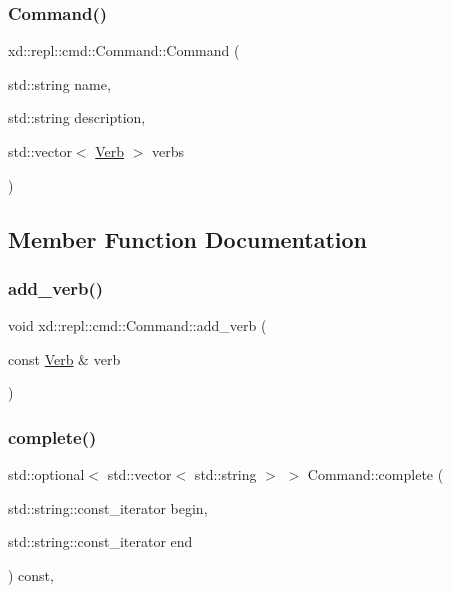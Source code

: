 \subsubsection{\texorpdfstring{Command()}{Command()}}
{\footnotesize\ttfamily xd\+::repl\+::cmd\+::\+Command\+::\+Command (\begin{DoxyParamCaption}\item[{std\+::string}]{name,  }\item[{std\+::string}]{description,  }\item[{std\+::vector$<$ \mbox{\hyperlink{classxd_1_1repl_1_1cmd_1_1_verb}{Verb}} $>$}]{verbs }\end{DoxyParamCaption})\hspace{0.3cm}{\ttfamily [inline]}}



\subsection{Member Function Documentation}
\mbox{\label{classxd_1_1repl_1_1cmd_1_1_command_a6f855c759e4d23f38f6286b4712251d4}} 
\subsubsection{\texorpdfstring{add\+\_\+verb()}{add\_verb()}}
{\footnotesize\ttfamily void xd\+::repl\+::cmd\+::\+Command\+::add\+\_\+verb (\begin{DoxyParamCaption}\item[{const \mbox{\hyperlink{classxd_1_1repl_1_1cmd_1_1_verb}{Verb}} \&}]{verb }\end{DoxyParamCaption})\hspace{0.3cm}{\ttfamily [inline]}}

\mbox{\label{classxd_1_1repl_1_1cmd_1_1_command_a5bb19b12a99fe48052c346db999942de}} 
\subsubsection{\texorpdfstring{complete()}{complete()}}
{\footnotesize\ttfamily std\+::optional$<$ std\+::vector$<$ std\+::string $>$ $>$ Command\+::complete (\begin{DoxyParamCaption}\item[{std\+::string\+::const\+\_\+iterator}]{begin,  }\item[{std\+::string\+::const\+\_\+iterator}]{end }\end{DoxyParamCaption}) const\hspace{0.3cm}{\ttfamily [override]}, {\ttfamily [virtual]}}



